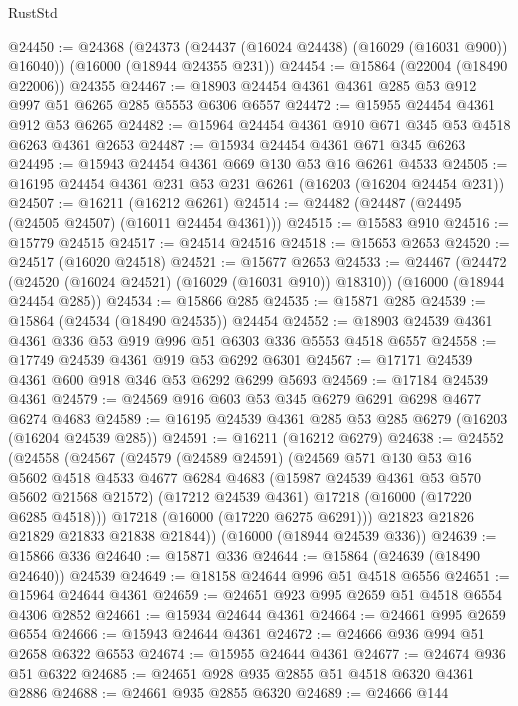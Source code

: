 \begin{lexlean}{RustStd}
\begin{coremodule}
@24450 := @24368
    (@24373 (@24437 (@16024 @24438) (@16029 (@16031 @900)) @16040))
    (@16000 (@18944 @24355 @231))
@24454 := @15864 (@22004 (@18490 @22006)) @24355
@24467 := @18903 @24454 @4361 @4361 @285 @53 @912 @997 @51 @6265 @285 @5553 @6306 @6557
@24472 := @15955 @24454 @4361 @912 @53 @6265
@24482 := @15964 @24454 @4361 @910 @671 @345 @53 @4518 @6263 @4361 @2653
@24487 := @15934 @24454 @4361 @671 @345 @6263
@24495 := @15943 @24454 @4361 @669 @130 @53 @16 @6261 @4533
@24505 := @16195 @24454 @4361 @231 @53 @231 @6261 (@16203 (@16204 @24454 @231))
@24507 := @16211 (@16212 @6261)
@24514 := @24482 (@24487 (@24495 (@24505 @24507) (@16011 @24454 @4361)))
@24515 := @15583 @910
@24516 := @15779 @24515
@24517 := @24514 @24516
@24518 := @15653 @2653
@24520 := @24517 (@16020 @24518)
@24521 := @15677 @2653
@24533 := @24467
    (@24472 (@24520 (@16024 @24521) (@16029 (@16031 @910)) @18310))
    (@16000 (@18944 @24454 @285))
@24534 := @15866 @285
@24535 := @15871 @285
@24539 := @15864 (@24534 (@18490 @24535)) @24454
@24552 := @18903 @24539 @4361 @4361 @336 @53 @919 @996 @51 @6303 @336 @5553 @4518 @6557
@24558 := @17749 @24539 @4361 @919 @53 @6292 @6301
@24567 := @17171 @24539 @4361 @600 @918 @346 @53 @6292 @6299 @5693
@24569 := @17184 @24539 @4361
@24579 := @24569 @916 @603 @53 @345 @6279 @6291 @6298 @4677 @6274 @4683
@24589 := @16195 @24539 @4361 @285 @53 @285 @6279 (@16203 (@16204 @24539 @285))
@24591 := @16211 (@16212 @6279)
@24638 := @24552
    (@24558
      (@24567
        (@24579
          (@24589 @24591)
          (@24569
            @571
            @130
            @53
            @16
            @5602
            @4518
            @4533
            @4677
            @6284
            @4683
            (@15987 @24539 @4361 @53 @570 @5602 @21568 @21572)
            (@17212 @24539 @4361)
            @17218
            (@16000 (@17220 @6285 @4518)))
          @17218
          (@16000 (@17220 @6275 @6291)))
        @21823
        @21826
        @21829
        @21833
        @21838
        @21844))
    (@16000 (@18944 @24539 @336))
@24639 := @15866 @336
@24640 := @15871 @336
@24644 := @15864 (@24639 (@18490 @24640)) @24539
@24649 := @18158 @24644 @996 @51 @4518 @6556
@24651 := @15964 @24644 @4361
@24659 := @24651 @923 @995 @2659 @51 @4518 @6554 @4306 @2852
@24661 := @15934 @24644 @4361
@24664 := @24661 @995 @2659 @6554
@24666 := @15943 @24644 @4361
@24672 := @24666 @936 @994 @51 @2658 @6322 @6553
@24674 := @15955 @24644 @4361
@24677 := @24674 @936 @51 @6322
@24685 := @24651 @928 @935 @2855 @51 @4518 @6320 @4361 @2886
@24688 := @24661 @935 @2855 @6320
@24689 := @24666 @144

\end{coremodule}
\end{lexlean}
